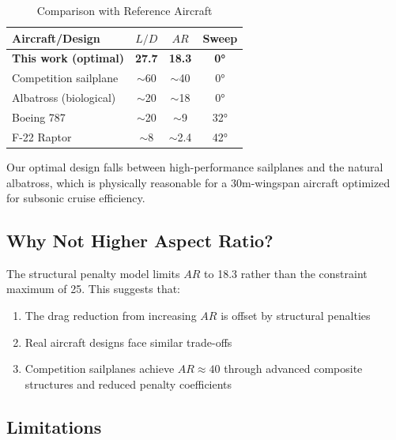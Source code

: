 \documentclass[11pt,a4paper]{article}
\begin{document}
\begin{table}[h]
\centering
\caption{Comparison with Reference Aircraft}
\label{tab:comparison}
\begin{tabular}{lccc}
\hline\hline
Aircraft/Design & $L/D$ & $AR$ & Sweep \\
\hline
\textbf{This work (optimal)} & \textbf{27.7} & \textbf{18.3} & \textbf{0°} \\
Competition sailplane & $\sim$60 & $\sim$40 & 0° \\
Albatross (biological) & $\sim$20 & $\sim$18 & 0° \\
Boeing 787 & $\sim$20 & $\sim$9 & 32° \\
F-22 Raptor & $\sim$8 & $\sim$2.4 & 42° \\
\hline\hline
\end{tabular}
\end{table}

Our optimal design falls between high-performance sailplanes and the natural albatross, which is physically reasonable for a 30m-wingspan aircraft optimized for subsonic cruise efficiency.

\subsection{Why Not Higher Aspect Ratio?}

The structural penalty model limits $AR$ to 18.3 rather than the constraint maximum of 25. This suggests that:

\begin{enumerate}
    \item The drag reduction from increasing $AR$ is offset by structural penalties
    \item Real aircraft designs face similar trade-offs
    \item Competition sailplanes achieve $AR \approx 40$ through advanced composite structures and reduced penalty coefficients
\end{enumerate}

\subsection{Limitations}
\end{document}
